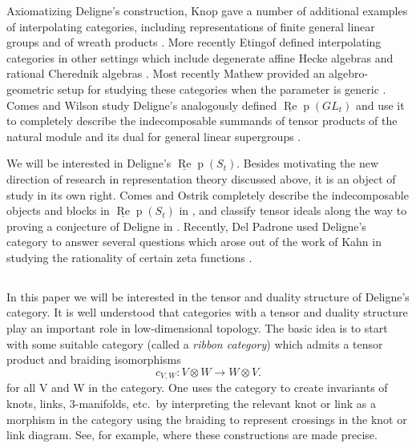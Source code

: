 \documentclass[12pt, reqno]{amsart}
\theoremstyle{definition}
\def\uRep{\underline{\operatorname{Re}}\!\operatorname{p}}
\renewcommand{\1}{_{(1)}}
\renewcommand{\2}{_{(2)}}
\newcommand{\3}{_{(3)}}
\newcommand{\4}{_{(4)}}
\begin{document}
Axiomatizing Deligne's construction, Knop gave a number of additional examples of interpolating categories, including representations of finite general linear groups and of wreath products \cite{Knop1, Knop2}.  More recently Etingof defined interpolating categories in other settings which include degenerate affine Hecke algebras and rational Cherednik algebras \cite{Etingof}.  Most recently Mathew provided an algebro-geometric setup for studying these categories when the parameter is generic \cite{Mathew}.  Comes and Wilson study Deligne's analogously defined $\uRep (GL_{t})$ and use it to completely describe the indecomposable summands of tensor products of the natural module and its dual for general linear supergroups \cite{CW}.   

We will be interested in Deligne's $\uRep(S_t)$.  Besides motivating the new direction of research in representation theory discussed above, it is an object of study in its own right.  Comes and Ostrik completely describe the indecomposable objects and blocks in $\uRep (S_{t})$ in \cite{CO1}, and classify tensor ideals along the way to proving a conjecture of Deligne  in \cite{CO2}.  Recently, Del Padrone used Deligne's category to answer several questions which arose out of the work of Kahn in studying the rationality of certain zeta functions \cite{Del}. 



\subsection{} In this paper we will be interested in the tensor and duality structure of Deligne's category.  It is well understood that categories with a tensor and duality structure play an important role in low-dimensional topology.  The basic idea is to start with some suitable category (called a \emph{ribbon category}) which admits a tensor product and braiding isomorphisms
\[
c_{V,W} : V \otimes W \to W \otimes V.
\]  for all V and W in the category.  One uses the category to create invariants of knots, links, $3$-manifolds, etc.\  by interpreting the relevant knot or link as a morphism in the category using the braiding to represent crossings in the knot or link diagram.  See, for example,  \cite{BK, Kas, Tu} where these constructions are made precise.  
\end{document}
